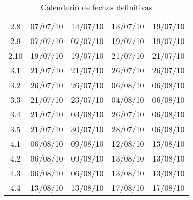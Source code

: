 \documentclass[11pt,a4paper,spanish,twoside]{report}
\begin{document}
\begin{table}[!h]
\begin{tabular}{|c||b{2.4cm}<{\centering}|b{2.1cm}<{\centering}
       ||b{1.9cm}<{\centering}|b{1.6cm}<{\centering}|}
     2.8   & 07/07/10 & 14/07/10 & 13/07/10 & 19/07/10 \\
     2.9   & 07/07/10 & 07/07/10 & 19/07/10 & 19/07/10 \\
     2.10  & 19/07/10 & 19/07/10 & 21/07/10 & 21/07/10 \\
     \hline
     3.1   & 21/07/10 & 21/07/10 & 26/07/10 & 26/07/10 \\
     3.2   & 26/07/10 & 26/07/10 & 06/08/10 & 06/08/10 \\
     3.3   & 21/07/10 & 23/07/10 & 04/08/10 & 06/08/10 \\
     3.4   & 21/07/10 & 03/08/10 & 26/07/10 & 06/08/10 \\
     3.5   & 21/07/10 & 30/07/10 & 28/07/10 & 06/08/10 \\
     \hline
     4.1   & 06/08/10 & 09/08/10 & 12/08/10 & 13/08/10 \\
     4.2   & 06/08/10 & 09/08/10 & 13/08/10 & 13/08/10 \\
     4.3   & 06/08/10 & 06/08/10 & 13/08/10 & 13/08/10 \\
     4.4   & 13/08/10 & 13/08/10 & 17/08/10 & 17/08/10 \\
     \hline
  \end{tabular}
  \caption{Calendario de fechas definitivas} \label{Tab:calfec}
\end{table}
\end{document}
